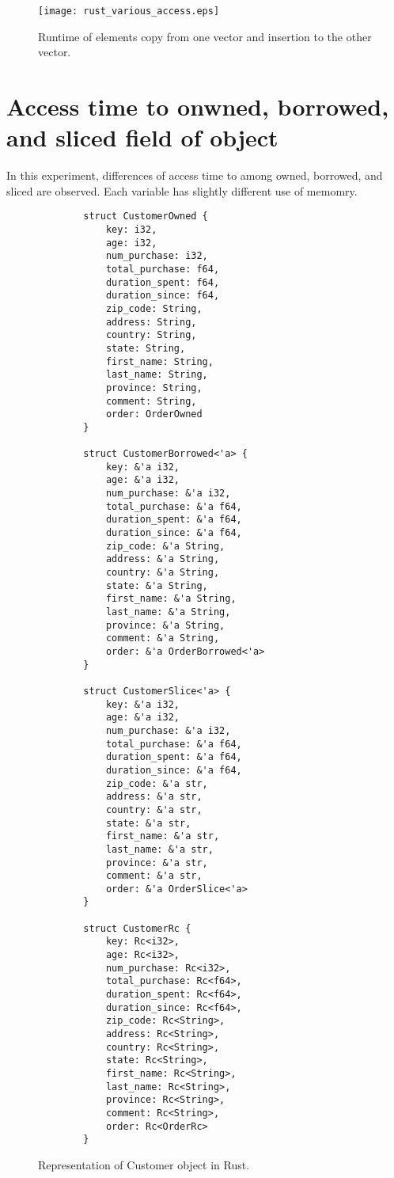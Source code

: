 \begin{figure}[htb]
    \texttt{[image: rust\_various\_access.eps]}
    \caption{Runtime of elements copy from one vector and insertion to the other vector.}
    \label{fig:Sampling}
\end{figure}

\section{Access time to onwned, borrowed, and sliced field of object}
\label{sec:history}
In this experiment, differences of access time to among owned, borrowed, and sliced are observed. 
Each variable has slightly different use of memomry. 


\begin{figure}[htb]
    \begin{lstlisting}
        struct CustomerOwned {
            key: i32,
            age: i32,
            num_purchase: i32,
            total_purchase: f64,
            duration_spent: f64, 
            duration_since: f64,
            zip_code: String,
            address: String,
            country: String,
            state: String,
            first_name: String,
            last_name: String,
            province: String,
            comment: String, 
            order: OrderOwned
        }

        struct CustomerBorrowed<'a> {
            key: &'a i32,
            age: &'a i32,
            num_purchase: &'a i32,
            total_purchase: &'a f64,
            duration_spent: &'a f64, 
            duration_since: &'a f64,
            zip_code: &'a String,
            address: &'a String,
            country: &'a String,
            state: &'a String,
            first_name: &'a String,
            last_name: &'a String,
            province: &'a String,
            comment: &'a String, 
            order: &'a OrderBorrowed<'a>
        }

        struct CustomerSlice<'a> {
            key: &'a i32,
            age: &'a i32,
            num_purchase: &'a i32,
            total_purchase: &'a f64,
            duration_spent: &'a f64, 
            duration_since: &'a f64,
            zip_code: &'a str,
            address: &'a str,
            country: &'a str, 
            state: &'a str,
            first_name: &'a str,
            last_name: &'a str,
            province: &'a str,
            comment: &'a str,
            order: &'a OrderSlice<'a>
        }

        struct CustomerRc {
            key: Rc<i32>,
            age: Rc<i32>,
            num_purchase: Rc<i32>,
            total_purchase: Rc<f64>,
            duration_spent: Rc<f64>, 
            duration_since: Rc<f64>,
            zip_code: Rc<String>,
            address: Rc<String>,
            country: Rc<String>,
            state: Rc<String>,
            first_name: Rc<String>,
            last_name: Rc<String>,
            province: Rc<String>,
            comment: Rc<String>, 
            order: Rc<OrderRc>
        }
    \end{lstlisting}
    \caption{Representation of Customer object in Rust.}
    \label{fig:Sampling}
\end{figure}


